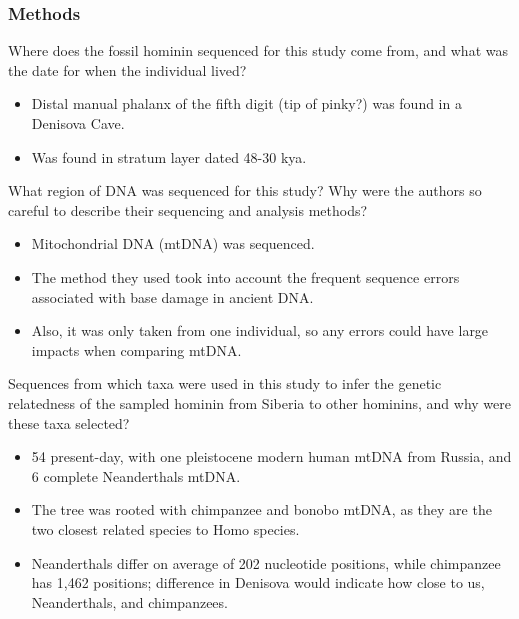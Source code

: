 \documentclass[12pt,a4paper]{article}
\begin{document}
\subsubsection{Methods}
\begin{itemize}
    {\color{G-Moon}\item Where does the fossil hominin sequenced for this study come from, and what was the date for when the individual lived?}
        \begin{itemize}
            \item Distal manual phalanx of the fifth digit (tip of pinky?) was found in a Denisova Cave.
            \item Was found in stratum layer dated 48-30 kya. 
        \end{itemize}
    {\color{G-Moon}\item What region of DNA was sequenced for this study? Why were the authors so careful to describe their sequencing and analysis methods?}
        \begin{itemize}
            \item Mitochondrial DNA (mtDNA) was sequenced.
            \item The method they used took into account the frequent sequence errors associated with base damage in ancient DNA.
            \item Also, it was only taken from one individual, so any errors could have large impacts when comparing mtDNA.
        \end{itemize}
    {\color{G-Moon}\item Sequences from which taxa were used in this study to infer the genetic relatedness of the sampled hominin from Siberia to other hominins, and why were these taxa selected?}
        \begin{itemize}
            \item 54 present-day, with one pleistocene modern human mtDNA from Russia, and 6 complete Neanderthals mtDNA.
            \item The tree was rooted with chimpanzee and bonobo mtDNA, as they are the two closest related species to Homo species.
            \item Neanderthals differ on average of 202 nucleotide positions, while chimpanzee has 1,462 positions; difference in Denisova would indicate how close to us, Neanderthals, and chimpanzees.
        \end{itemize}
\end{itemize}
\end{document}
